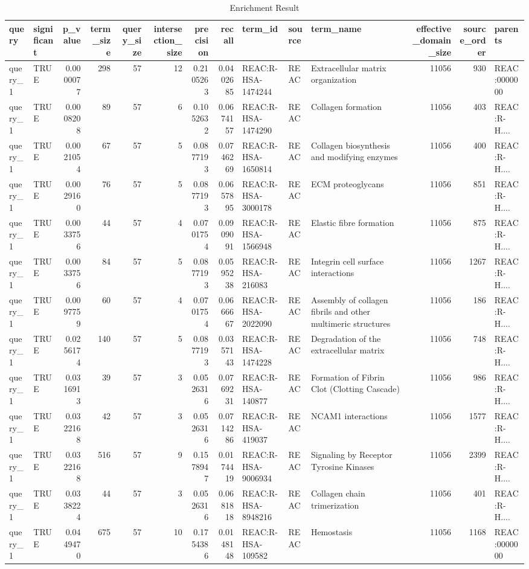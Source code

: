 \documentclass[
]{book}
\begin{document}
\begin{table}
\centering
\caption{\label{tab:unnamed-chunk-18}Enrichment Result}
\centering
\fontsize{10}{12}\selectfont
\begin{tabular}[t]{l|l|r|r|r|r|r|r|l|l|l|r|r|l}
\hline
query & significant & p\_value & term\_size & query\_size & intersection\_size & precision & recall & term\_id & source & term\_name & effective\_domain\_size & source\_order & parents\\
\hline
query\_1 & TRUE & 0.0000077 & 298 & 57 & 12 & 0.2105263 & 0.0402685 & REAC:R-HSA-1474244 & REAC & Extracellular matrix organization & 11056 & 930 & REAC:0000000\\
\hline
query\_1 & TRUE & 0.0008208 & 89 & 57 & 6 & 0.1052632 & 0.0674157 & REAC:R-HSA-1474290 & REAC & Collagen formation & 11056 & 403 & REAC:R-H....\\
\hline
query\_1 & TRUE & 0.0021054 & 67 & 57 & 5 & 0.0877193 & 0.0746269 & REAC:R-HSA-1650814 & REAC & Collagen biosynthesis and modifying enzymes & 11056 & 400 & REAC:R-H....\\
\hline
query\_1 & TRUE & 0.0029160 & 76 & 57 & 5 & 0.0877193 & 0.0657895 & REAC:R-HSA-3000178 & REAC & ECM proteoglycans & 11056 & 851 & REAC:R-H....\\
\hline
query\_1 & TRUE & 0.0033756 & 44 & 57 & 4 & 0.0701754 & 0.0909091 & REAC:R-HSA-1566948 & REAC & Elastic fibre formation & 11056 & 875 & REAC:R-H....\\
\hline
query\_1 & TRUE & 0.0033756 & 84 & 57 & 5 & 0.0877193 & 0.0595238 & REAC:R-HSA-216083 & REAC & Integrin cell surface interactions & 11056 & 1267 & REAC:R-H....\\
\hline
query\_1 & TRUE & 0.0097759 & 60 & 57 & 4 & 0.0701754 & 0.0666667 & REAC:R-HSA-2022090 & REAC & Assembly of collagen fibrils and other multimeric structures & 11056 & 186 & REAC:R-H....\\
\hline
query\_1 & TRUE & 0.0256174 & 140 & 57 & 5 & 0.0877193 & 0.0357143 & REAC:R-HSA-1474228 & REAC & Degradation of the extracellular matrix & 11056 & 748 & REAC:R-H....\\
\hline
query\_1 & TRUE & 0.0316913 & 39 & 57 & 3 & 0.0526316 & 0.0769231 & REAC:R-HSA-140877 & REAC & Formation of Fibrin Clot (Clotting Cascade) & 11056 & 986 & REAC:R-H....\\
\hline
query\_1 & TRUE & 0.0322168 & 42 & 57 & 3 & 0.0526316 & 0.0714286 & REAC:R-HSA-419037 & REAC & NCAM1 interactions & 11056 & 1577 & REAC:R-H....\\
\hline
query\_1 & TRUE & 0.0322168 & 516 & 57 & 9 & 0.1578947 & 0.0174419 & REAC:R-HSA-9006934 & REAC & Signaling by Receptor Tyrosine Kinases & 11056 & 2399 & REAC:R-H....\\
\hline
query\_1 & TRUE & 0.0338224 & 44 & 57 & 3 & 0.0526316 & 0.0681818 & REAC:R-HSA-8948216 & REAC & Collagen chain trimerization & 11056 & 401 & REAC:R-H....\\
\hline
query\_1 & TRUE & 0.0449470 & 675 & 57 & 10 & 0.1754386 & 0.0148148 & REAC:R-HSA-109582 & REAC & Hemostasis & 11056 & 1168 & REAC:0000000\\
\hline
\end{tabular}
\end{table}
\end{document}
